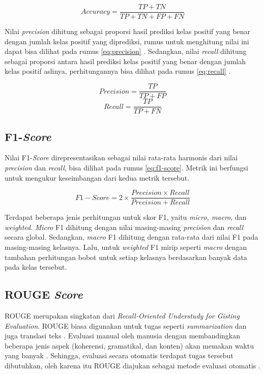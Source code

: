 \begin{equation}
    Accuracy = \frac{TP + TN}{TP + TN + FP + FN}
    \label{eq:accuracy}
\end{equation}

Nilai \textit{precision} dihitung sebagai proporsi hasil prediksi kelas positif yang benar dengan jumlah kelas positif yang diprediksi, rumus untuk menghitung nilai ini dapat bisa dilihat pada rumus \ref{eq:precision} \parencite{metrics}. Sedangkan, nilai \textit{recall} dihitung sebagai proporsi antara hasil prediksi kelas positif yang benar dengan jumlah kelas positif aslinya, perhitungannya bisa dilihat pada rumus \ref{eq:recall} \parencite{metrics}.

\begin{equation}
    Precision = \frac{TP}{TP + FP}
    \label{eq:precision}
\end{equation}
\begin{equation}
    Recall = \frac{TP}{TP + FN}
    \label{eq:recall}
\end{equation}

\subsection{F1-\textit{Score}}
Nilai F1-\textit{Score} direpresentasikan sebagai nilai rata-rata harmonis dari nilai \textit{precision} dan \textit{recall}, bisa dilihat pada rumus \ref{eq:f1-score}. Metrik ini berfungsi untuk mengukur keseimbangan dari kedua metrik tersebut.

\begin{equation}
    F1-Score = 2 \times \frac{Precision \times Recall}{Precision + Recall}
    \label{eq:f1-score}
\end{equation}

Terdapat beberapa jenis perhitungan untuk skor F1, yaitu \textit{micro, macro}, dan \textit{weighted}. \textit{Micro} F1 dihitung dengan nilai masing-masing \textit{precision} dan \textit{recall} secara global. Sedangkan, \textit{macro} F1 dihitung dengan rata-rata dari nilai F1 pada masing-masing kelasnya. Lalu, untuk \textit{weighted} F1 mirip seperti \textit{macro} dengan tambahan perhitungan bobot untuk setiap kelasnya berdasarkan banyak data pada kelas tersebut.

\subsection{ROUGE \textit{Score}}

ROUGE merupakan singkatan dari \textit{Recall-Oriented Understudy for Gisting Evaluation}. ROUGE biasa digunakan untuk tugas seperti \textit{summarization} dan juga translasi teks \parencite{rouge}. Evaluasi manual oleh manusia dengan membandingkan beberapa jenis aspek (koherensi, gramatikal, dan konten) akan memakan waktu yang banyak \parencite{rouge}. Sehingga, evaluasi secara otomatis terdapat tugas tersebut dibutuhkan, oleh karena itu ROUGE diajukan sebagai metode evaluasi otomatis \parencite{rouge}.

